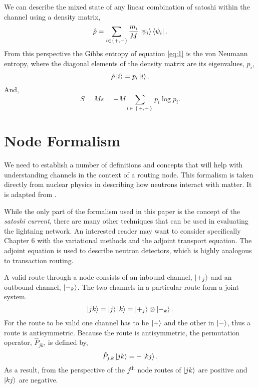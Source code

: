 \documentclass[review,12pt]{elsarticle}
\begin{document}
We can describe the mixed state of any linear combination of satoshi within the channel using a density matrix,
\begin{equation}
  \hat{\rho} = \sum_{i\in\left\{+,-\right\}} \frac{m_i}{M}\Ket{\psi_i}\Bra{\psi_i}. \nonumber
\end{equation}
From this perspective the Gibbs entropy of equation \ref{eq:1} is the von Neumann entropy, where the diagonal elements of the density matrix are its eigenvalues, $p_i$,
\begin{equation}
  \hat{\rho} \Ket{i} = p_i \Ket{i}. \nonumber
\end{equation}
And,
\begin{equation}
  S = M s  = - M \sum_{i\in\left\{+,-\right\}} p_i \log p_i. \nonumber
\end{equation}

\section{Node Formalism}
We need to establish a number of definitions and concepts that will help with understanding channels in the context of a routing node.
This formalism is taken directly from nuclear physics in describing how neutrons interact with matter.
It is adapted from \cite[pp.~3--6]{Bell:1970}.

While the only part of the formalism used in this paper is the concept of the \emph{satoshi current}, there are many other techniques that can be used in evaluating the lightning network.
An interested reader may want to consider specifically Chapter 6 with the variational methods and the adjoint transport equation.
The adjoint equation is used to describe neutron detectors, which is highly analogous to transaction routing.


A valid route through a node consists of an inbound channel, $\Ket{+_j}$ and an outbound channel, $\Ket{-_k}$.
The two channels in a particular route form a joint system.
\begin{equation}
  \Ket{jk} = \Ket{j}\Ket{k} = \Ket{+_j} \otimes \Ket{-_k}. \nonumber
\end{equation}
For the route to be valid one channel has to be $\Ket{+}$ and the other in $\Ket{-}$, thus a route is antisymmetric.
Because the route is antisymmetric, the permutation operator, $\hat{P}_{jk}$, is defined by,
\begin{equation}
  \hat{P}_{j,k} \Ket{jk} = - \Ket{kj}. \nonumber
\end{equation}
As a result, from the perspective of the $j^\textrm{th}$ node routes of $\Ket{jk}$ are positive and $\Ket{kj}$ are negative.
\end{document}
